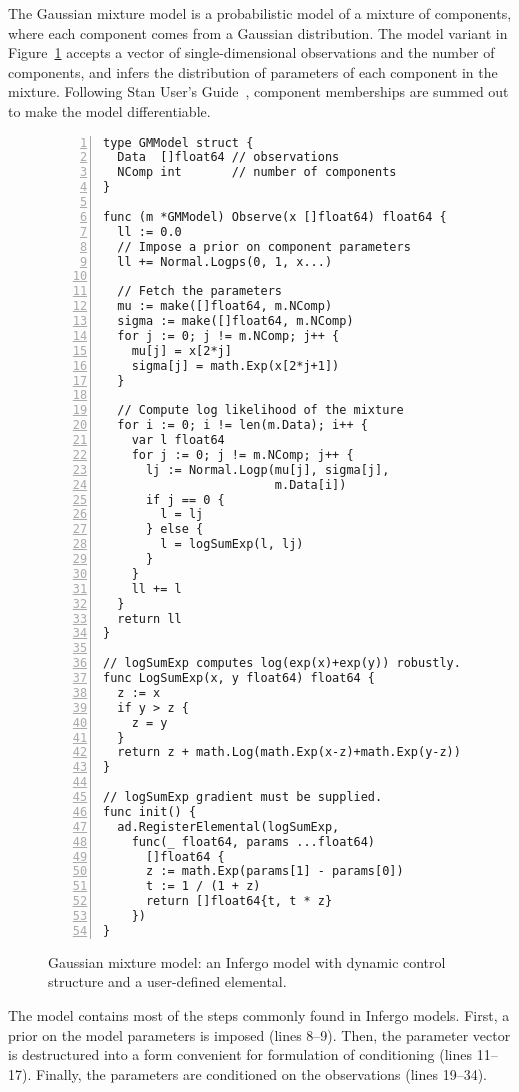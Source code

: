 \documentclass[sigplan,review,10pt,anonymous]{acmart}
\begin{document}
\begin{sloppypar}
The Gaussian mixture model is a probabilistic model of a mixture
of components, where each component comes from a Gaussian
distribution. The model variant in
Figure~\ref{fig:gaussian-mixture} accepts a vector of
single-dimensional observations and the number of components,
and infers the distribution of parameters of each component
in the mixture. Following Stan User's Guide~\cite{SDT18},
component memberships are summed out to make the model
differentiable.
\begin{figure}
\begin{lstlisting}[framexleftmargin=10pt,numbers=left]
type GMModel struct {
  Data  []float64 // observations
  NComp int       // number of components
}

func (m *GMModel) Observe(x []float64) float64 {
  ll := 0.0
  // Impose a prior on component parameters
  ll += Normal.Logps(0, 1, x...)

  // Fetch the parameters
  mu := make([]float64, m.NComp)
  sigma := make([]float64, m.NComp)
  for j := 0; j != m.NComp; j++ {
    mu[j] = x[2*j]
    sigma[j] = math.Exp(x[2*j+1])
  }

  // Compute log likelihood of the mixture
  for i := 0; i != len(m.Data); i++ {
    var l float64
    for j := 0; j != m.NComp; j++ {
      lj := Normal.Logp(mu[j], sigma[j],
                        m.Data[i])
      if j == 0 {
        l = lj
      } else {
        l = logSumExp(l, lj)
      }
    }
    ll += l
  }
  return ll
}

// logSumExp computes log(exp(x)+exp(y)) robustly.
func LogSumExp(x, y float64) float64 {
  z := x
  if y > z {
    z = y
  }
  return z + math.Log(math.Exp(x-z)+math.Exp(y-z))
}

// logSumExp gradient must be supplied.
func init() {
  ad.RegisterElemental(logSumExp,
    func(_ float64, params ...float64)
      []float64 {
      z := math.Exp(params[1] - params[0])
      t := 1 / (1 + z)
      return []float64{t, t * z}
    })
}
\end{lstlisting}
\caption{Gaussian mixture model: an Infergo model with
  dynamic control structure and a user-defined elemental.}
\label{fig:gaussian-mixture}
\end{figure}
The model contains most of the steps commonly found in Infergo
models. First, a prior on the model parameters is imposed (lines
8--9). Then, the parameter vector is destructured into a form
convenient for formulation of conditioning (lines 11--17).
Finally, the parameters are conditioned on the observations
(lines 19--34). 


\end{sloppypar}
\end{document}
